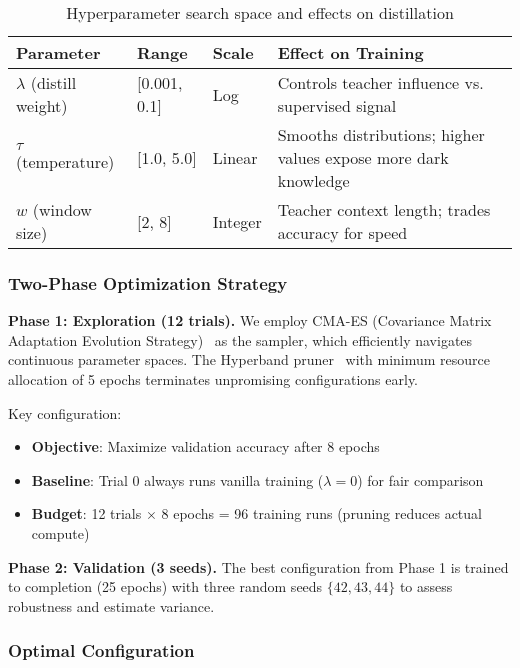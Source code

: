 \begin{table}[h]
\centering
\caption{Hyperparameter search space and effects on distillation}
\label{tab:hparam-space}
\small
\begin{tabular}{lllp{5cm}}
\toprule
\textbf{Parameter} & \textbf{Range} & \textbf{Scale} & \textbf{Effect on Training} \\
\midrule
$\lambda$ (distill weight) & [0.001, 0.1] & Log & Controls teacher influence vs. supervised signal \\
$\tau$ (temperature) & [1.0, 5.0] & Linear & Smooths distributions; higher values expose more dark knowledge \\
$w$ (window size) & [2, 8] & Integer & Teacher context length; trades accuracy for speed \\
\bottomrule
\end{tabular}
\end{table}

\subsubsection{Two-Phase Optimization Strategy}

\textbf{Phase 1: Exploration (12 trials).} We employ CMA-ES (Covariance Matrix Adaptation Evolution Strategy)~\cite{hansenCMAESEvolutionStrategy2016} as the sampler, which efficiently navigates continuous parameter spaces. The Hyperband pruner~\cite{liHyperbandNovelBanditBased2018} with minimum resource allocation of 5 epochs terminates unpromising configurations early.

Key configuration:
\begin{itemize}[noitemsep,topsep=0pt]
\item \textbf{Objective}: Maximize validation accuracy after 8 epochs
\item \textbf{Baseline}: Trial 0 always runs vanilla training ($\lambda = 0$) for fair comparison
\item \textbf{Budget}: 12 trials $\times$ 8 epochs = 96 training runs (pruning reduces actual compute)
\end{itemize}

\textbf{Phase 2: Validation (3 seeds).} The best configuration from Phase 1 is trained to completion (25 epochs) with three random seeds $\{42, 43, 44\}$ to assess robustness and estimate variance.

\subsubsection{Optimal Configuration}

